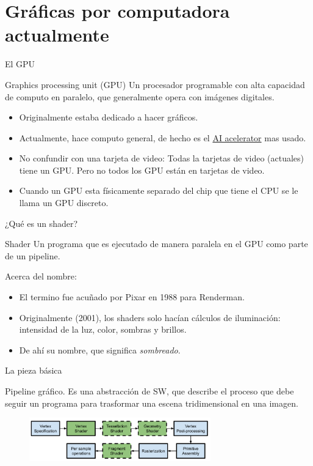 \section{Gráficas por computadora actualmente}

\begin{frame}{El GPU}
\begin{block}{Graphics processing unit (GPU)}
    Un procesador programable con alta capacidad de computo en paralelo, que generalmente opera con imágenes digitales.
\end{block}
    \begin{itemize}
        \item Originalmente estaba dedicado a hacer gráficos.
        \item Actualmente, hace computo general, de hecho es el \href{https://en.wikipedia.org/wiki/AI_accelerator}{AI acelerator} mas usado.
        \item No confundir con una tarjeta de video: Todas la tarjetas de video (actuales) tiene un GPU. Pero no todos los GPU están en tarjetas de video.
        \item Cuando un GPU esta físicamente separado del chip que tiene el CPU se le llama un GPU discreto.
     \end{itemize}
\end{frame}

\begin{frame}{¿Qué es un shader?}
\begin{block}{Shader}
    Un programa que es ejecutado de manera paralela en el GPU como parte de un pipeline.
\end{block}
Acerca del nombre:
    \begin{itemize}
        \item El termino fue acuñado por Pixar en 1988 para Renderman.
        \item Originalmente (2001), los shaders solo hacían cálculos de iluminación: intensidad de la luz, color, sombras y brillos.
        \item De ahí su nombre, que significa \emph{sombreado}.
     \end{itemize}

\end{frame}

\begin{frame}{La pieza básica}
\begin{block}{Pipeline gráfico.}
    Es una abstracción de SW, que describe el proceso que debe seguir un programa para trasformar una escena tridimensional en una imagen.
\end{block}
\begin{figure}[htb]
  \centering
  \includegraphics[width=0.7\textwidth]{img/RenderPipeline}
\end{figure} 
\end{frame}

